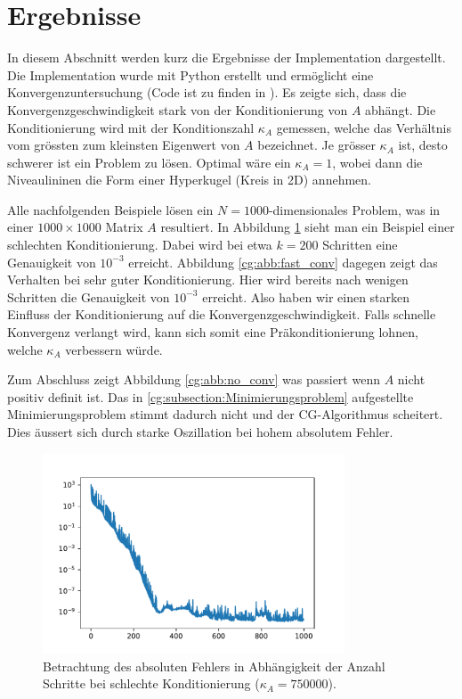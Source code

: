 \section{Ergebnisse}
\label{cg:section:ergebnisse}

In diesem Abschnitt werden kurz die Ergebnisse der Implementation dargestellt.
Die Implementation wurde mit Python erstellt und ermöglicht eine Konvergenzuntersuchung (Code ist zu finden in \cite{cg:online:code}).
Es zeigte sich, dass die Konvergenzgeschwindigkeit stark von der Konditionierung von $A$ abhängt.
Die Konditionierung wird mit der Konditionszahl $\kappa_A$ gemessen, welche das Verhältnis vom grössten zum kleinsten Eigenwert von $A$ bezeichnet.
Je grösser $\kappa_A$ ist, desto schwerer ist ein Problem zu lösen.
Optimal wäre ein $\kappa_A = 1$, wobei dann die Niveaulininen die Form einer Hyperkugel (Kreis in 2D) annehmen.

Alle nachfolgenden Beispiele lösen ein $N=1000$-dimensionales Problem, was in einer $1000 \times 1000$ Matrix $A$ resultiert.
In Abbildung \ref{cg:abb:slow_conv} sieht man ein Beispiel einer schlechten Konditionierung.
Dabei wird bei etwa $k=200$ Schritten eine Genauigkeit von $10^{-3}$ erreicht.
Abbildung \ref{cg:abb:fast_conv} dagegen zeigt das Verhalten bei sehr guter Konditionierung.
Hier wird bereits nach wenigen Schritten die Genauigkeit von $10^{-3}$ erreicht.
Also haben wir einen starken Einfluss der Konditionierung auf die Konvergenzgeschwindigkeit.
Falls schnelle Konvergenz verlangt wird, kann sich somit eine Präkonditionierung lohnen, welche $\kappa_A$ verbessern würde.

Zum Abschluss zeigt Abbildung \ref{cg:abb:no_conv} was passiert wenn $A$ nicht positiv definit ist.
Das in \ref{cg:subsection:Minimierungsproblem} aufgestellte Minimierungsproblem stimmt dadurch nicht und der CG-Algorithmus scheitert.
Dies äussert sich durch starke Oszillation bei hohem absolutem Fehler.

\begin{figure}	
	\centering
	\includegraphics[width=0.8\textwidth]{papers/cg/images/convergence_k_750000}
	\caption{Betrachtung des absoluten Fehlers in Abhängigkeit der Anzahl Schritte bei schlechte Konditionierung ($\kappa_A=750000$).}
	\label{cg:abb:slow_conv}
\end{figure}

